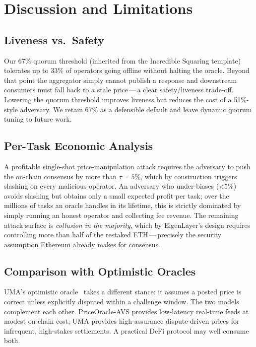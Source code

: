 \section{Discussion and Limitations}
\label{sec:discussion}

\subsection{Liveness vs.\ Safety}

Our 67\% quorum threshold (inherited from the Incredible Squaring
template) tolerates up to 33\% of operators going offline without
halting the oracle.  Beyond that point the aggregator simply cannot
publish a response and downstream consumers must fall back to a stale
price\,---\,a clear safety/liveness trade-off.  Lowering the quorum
threshold improves liveness but reduces the cost of a 51\%-style
adversary.  We retain 67\% as a defensible default and leave dynamic
quorum tuning to future work.

\subsection{Per-Task Economic Analysis}

A profitable single-shot price-manipulation attack requires the
adversary to push the on-chain consensus by more than $\tau{=}5\%$,
which by construction triggers slashing on every malicious
operator.  An adversary who under-biases (\textless 5\%) avoids
slashing but obtains only a small expected profit per task; over the
millions of tasks an oracle handles in its lifetime, this is
strictly dominated by simply running an honest operator and
collecting fee revenue.  The remaining attack surface is
\emph{collusion in the majority}, which by EigenLayer's design
requires controlling more than half of the restaked
ETH\,---\,precisely the security assumption Ethereum already
makes for consensus.

\subsection{Comparison with Optimistic Oracles}

UMA's optimistic oracle~\cite{uma2020} takes a different stance: it
assumes a posted price is correct unless explicitly disputed within
a challenge window.  The two models complement each other.
PriceOracle-AVS provides low-latency real-time feeds at modest
on-chain cost; UMA provides high-assurance dispute-driven prices for
infrequent, high-stakes settlements.  A practical DeFi protocol may
well consume both.

